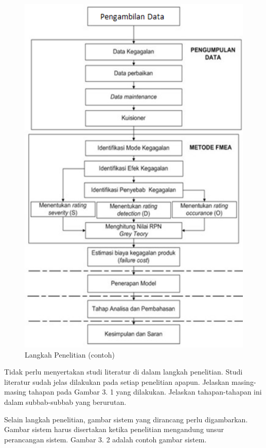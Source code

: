 \documentclass[12pt]{article}
\begin{document}
\begin{figure}[!ht]
\centering
 	\includegraphics[width=1\textwidth]{img-4.png}
 	\caption{Langkah Penelitian (contoh)}  
\end{figure}

\pagebreak
Tidak perlu menyertakan studi literatur di dalam langkah penelitian. Studi literatur sudah jelas dilakukan pada setiap penelitian apapun. Jelaskan masing-masing tahapan pada Gambar 3. 1 yang dilakukan. Jelaskan tahapan-tahapan ini dalam subbab-subbab yang berurutan.

Selain langkah penelitian, gambar sistem yang dirancang perlu digambarkan. Gambar sistem harus disertakan ketika penelitian mengandung unsur perancangan sistem. Gambar 3. 2 adalah contoh gambar sistem.
\end{document}
